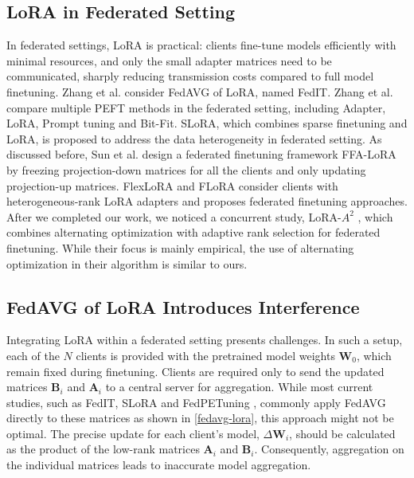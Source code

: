\documentclass{article}
\theoremstyle{plain}
\theoremstyle{definition}
\theoremstyle{remark}
\begin{document}
\subsection{LoRA in Federated Setting}
\vspace{-0.3cm}
In federated settings, LoRA is practical: clients fine-tune models efficiently with minimal resources, and only the small adapter matrices need to be communicated, sharply reducing transmission costs compared to full model finetuning. Zhang et al. consider FedAVG of LoRA, named FedIT\cite{zhang2023towards}. Zhang et al. \cite{zhang-etal-2023-fedpetuning} compare multiple PEFT methods in the federated setting, including Adapter\cite{houlsby2019parameterefficient}, LoRA\cite{hu2021lora}, Prompt tuning\cite{liu2022ptuning} and Bit-Fit\cite{zaken2022bitfit}. SLoRA\cite{babakniya2023slora}, which combines sparse finetuning and LoRA, is proposed to address the data heterogeneity in federated setting. 
As discussed before, Sun et al. \cite{sun2024improving} design a federated finetuning framework FFA-LoRA by freezing projection-down matrices for all the clients and only updating projection-up matrices. %
FlexLoRA\cite{bai2024federatedfinetuninglargelanguage} and FLoRA \cite{wang2024florafederatedfinetuninglarge} consider clients with heterogeneous-rank LoRA adapters and proposes federated finetuning approaches. After we completed our work, we noticed a concurrent study, LoRA-$A^2$ \cite{koo2024robustefficientfederatedlowrank}, which combines alternating optimization with adaptive rank selection for federated finetuning. While their focus is mainly empirical, the use of alternating optimization in their algorithm is similar to ours.


\vspace{-0.3cm}

\subsection{FedAVG of LoRA Introduces Interference}\label{interference}
\vspace{-0.3cm}
Integrating LoRA within a federated setting presents challenges. In such a setup, each of the $N$ clients is provided with the pretrained model weights $\mathbf{W}_0$, which remain fixed during finetuning. Clients are required only to send the updated matrices $\mathbf{B}_i$ and $\mathbf{A}_i$ to a central server for aggregation. While most current studies, such as FedIT\cite{zhang2023towards}, SLoRA \cite{babakniya2023slora} and FedPETuning \cite{zhang-etal-2023-fedpetuning}, commonly apply FedAVG directly to these matrices as shown in \eqref{fedavg-lora}, this approach might not be optimal. The precise update for each client’s model, $\Delta \mathbf{W}_i$, should be calculated as the product of the low-rank matrices $\mathbf{A}_i$ and $\mathbf{B}_i$. Consequently, aggregation on the individual matrices leads to inaccurate model aggregation. 
\end{document}
